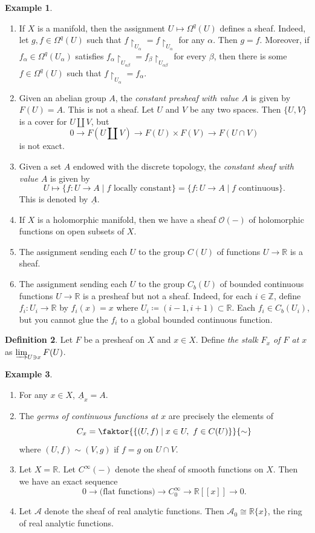 \documentclass[10pt,letterpaper,cm]{nupset}
\theoremstyle{definition}
\newtheorem{definition}{Definition}[subsection]
\newtheorem{exmp}[definition]{Example}
\theoremstyle{theorem}
\theoremstyle{remark}
\newcommand{\R}{\mathbb{R}}
\newcommand{\Z}{\mathbb Z}
\newcommand{\1}{\mathbb{1}}
\newcommand{\0}{\vec 0}
\begin{document}
\begin{exmp} $ $
\begin{enumerate}
\item If $X$ is a manifold, then the assignment $U \mapsto \Omega^q(U)$ defines a sheaf. Indeed, let $g,f \in \Omega^q(U)$ such that $f \restriction_{U_{\alpha}} = f \restriction_{U_{\alpha}}$ for any $\alpha$. Then $g=f$. Moreover, if $f_{\alpha}\in \Omega^q(U_{\alpha})$ satisfies $f_{\alpha}\restriction_{U_{\alpha \beta}} = f_{\beta} \restriction_{U_{\alpha \beta}}$ for every $\beta$, then there is some $f \in \Omega^q(U)$ such that $f \restriction_{U_{\alpha}} = f_{\alpha}$.
\item Given an  abelian group $A$, the \textit{constant presheaf with value $A$} is given by $F(U) = A$. This is not a sheaf. Let $U$ and $V$ be any two spaces. Then $\{U, V\}$ is a cover for $U \coprod V$, but $$0 \to F(U \coprod V) \to F(U) \times F(V) \to F(U \cap V)$$ is not exact.
\item Given a set $A$ endowed with the discrete topology, the \textit{constant sheaf with value $A$}  is given by $$U \mapsto \{ f : U \to A \mid f \text{ locally constant}\} =   \{ f : U \to A \mid f \text{ continuous}\}.$$ This is denoted by  $\underline{A}$.
\item If $X$ is a holomorphic manifold, then we have a sheaf $\mathcal{O}({-})$ of holomorphic functions on open subsets of $X$.
\item The assignment sending each $U$ to the group $C(U)$ of functions $U \to \R$ is a sheaf.
\item  The assignment sending each $U$ to the group $C_b(U)$ of bounded continuous functions $U \to \R$ is a presheaf but not a sheaf. Indeed, for each $i\in \Z$, define $f_i : U_i \to \R$ by $f_i(x) = x$ where $U_i \coloneqq  (i-1, i+1)\subset \R$. Each $f_i \in C_b(U_i)$, but you cannot glue the $f_i$ to a global bounded continuous function.  
\end{enumerate}
\end{exmp}

\begin{definition} 
Let $F$ be a presheaf on $X$ and $x\in X$. Define \textit{the stalk $F_x$ of $F$ at $x$} as $\varinjlim_{U \ni x}F(U)$.
\end{definition}

\begin{exmp} $ $
\begin{enumerate}
\item For any $x \in X$, $\underline{A}_x =A$.
\item The \textit{germs of continuous functions at $x$} are precisely the elements of $$C_x = \faktor{  \{(U, f) \mid x\in U, \ f \in C(U)\}    }{\sim}$$ where $(U, f) \sim(V, g)$ if $f =g$ on $U \cap V$.
\item Let $X = \R$. Let $C^{\infty}({-})$ denote the sheaf of smooth functions on $X$. Then we have an exact sequence $$ 0 \to \text{(flat functions)} \to C_0^{\infty} \to \R[[x]] \to 0   .$$
\item Let $\mathcal{A}$ denote the sheaf of real analytic functions. Then $\mathcal{A}_0 \cong \R\{x\}$, the ring of real analytic functions.
\end{enumerate}
\end{exmp}
\end{document}
